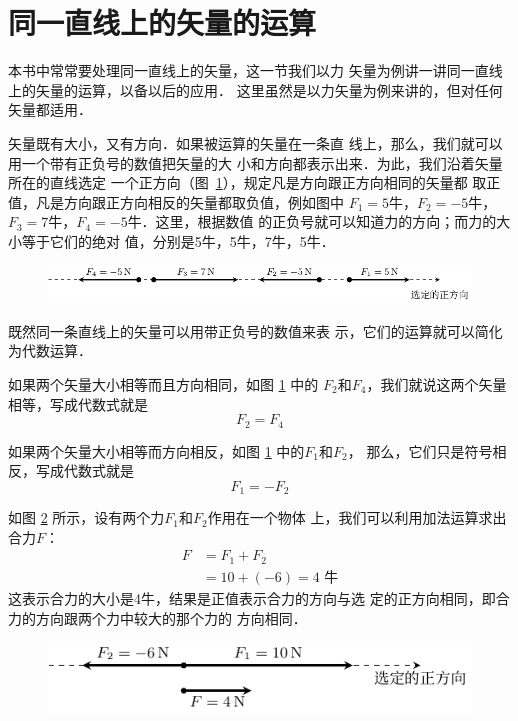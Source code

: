 \section{同一直线上的矢量的运算} 
    本书中常常要处理同一直线上的矢量，这一节我们以力
矢量为例讲一讲同一直线上的矢量的运算，以备以后的应用．
这里虽然是以力矢量为例来讲的，但对任何矢量都适用．

    矢量既有大小，又有方向．如果被运算的矢量在一条直
线上，那么，我们就可以用一个带有正负号的数值把矢量的大
小和方向都表示出来．为此，我们沿着矢量所在的直线选定
一个正方向（图~\ref{fig_A_1-33}），规定凡是方向跟正方向相同的矢量都
取正值，凡是方向跟正方向相反的矢量都取负值，例如图中
$F_1=5$牛，$F_2=-5$牛，$F_3=7$牛，$F_4=-5$牛．这里，根据数值
的正负号就可以知道力的方向；而力的大小等于它们的绝对
值，分别是5牛，5牛，7牛，5牛．

\begin{figure} [htp]
\centering
\includegraphics{fig/A/1-33.pdf} 
\caption{} \label{fig_A_1-33} 
\end{figure} 

既然同一条直线上的矢量可以用带正负号的数值来表
示，它们的运算就可以简化为代数运算．

    如果两个矢量大小相等而且方向相同，如图 \ref{fig_A_1-33} 中的
$F_2$和$F_4$，我们就说这两个矢量相等，写成代数式就是
\begin{equation} 
F_2=F_4
\end{equation} 

    如果两个矢量大小相等而方向相反，如图 \ref{fig_A_1-33} 中的$F_1$和$F_2$，
那么，它们只是符号相反，写成代数式就是
\begin{equation} 
F_1=-F_2
\end{equation} 

    如图 \ref{fig_A_1-34} 所示，设有两个力$F_1$和$F_2$作用在一个物体
上，我们可以利用加法运算求出合力$F$：
\begin{equation}\label{eq-A-1.5}
\begin{split} 
F&=F_1+F_2\\
&=10+(-6)=4\text{ 牛} 
\end{split} 
\end{equation} 
这表示合力的大小是4牛，结果是正值表示合力的方向与选
定的正方向相同，即合力的方向跟两个力中较大的那个力的
方向相同．

\begin{figure} [htp]
\centering
\includegraphics{fig/A/1-34.pdf} 
\caption{} \label{fig_A_1-34} 
\end{figure} 

